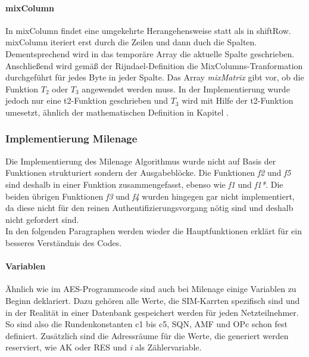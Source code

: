 		\paragraph{mixColumn}
		In mixColumn findet eine umgekehrte Herangehensweise statt als in shiftRow.
		mixColumn iteriert erst durch die Zeilen und dann duch die Spalten. Dementsprechend
		wird in das temporäre Array die aktuelle Spalte geschrieben. \\
		Anschließend wird gemäß der Rijndael-Definition die MixColumns-Tranformation
		durchgeführt für jedes Byte in jeder Spalte. Das Array \emph{mixMatrix} gibt vor,
		ob die Funktion $T_2$ oder $T_3$ angewendet werden muss. In der Implementierung
		wurde jedoch nur eine t2-Funktion geschrieben und $T_3$ wird mit Hilfe der 
		t2-Funktion umesetzt, ähnlich der mathematischen Definition in Kapitel
		.

	\subsubsection{Implementierung Milenage}
	\label{implementierung-milenage}
	Die Implementierung des Milenage Algorithmus wurde nicht auf Basis der Funktionen
	strukturiert sondern der Ausgabeblöcke. Die Funktionen \emph{f2} und \emph{f5} sind
	deshalb in einer Funktion zusammengefasst, ebenso wie \emph{f1} und \emph{f1*}. Die
	beiden übrigen Funktionen \emph{f3} und \emph{f4} wurden hingegen gar nicht implementiert,
	da diese nicht für den reinen Authentifizierungsvorgang nötig sind und deshalb nicht
	gefordert sind. \\
	In den folgenden Paragraphen werden wieder die Hauptfunktionen erklärt für ein besseres
	Verständnis des Codes.
	
		\paragraph{Variablen}
		Ähnlich wie im AES-Programmcode sind auch bei Milenage einige Variablen zu Beginn
		deklariert. Dazu gehören alle Werte, die SIM-Karrten spezifisch sind und in der
		Realität in einer Datenbank gespeichert werden für jeden Netzteilnehmer. So sind also
		die Rundenkonstanten c1 bis c5, SQN, AMF und OPc schon fest definiert. Zusätzlich sind
		die Adressräume für die Werte, die generiert werden reserviert, wie AK oder RES und \emph{i}
		als Zählervariable.
		
